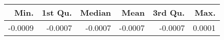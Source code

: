 \begin{table}[ht]
\centering
\begin{tabular}{rrrrrr}
  \hline
Min. & 1st Qu. & Median & Mean & 3rd Qu. & Max. \\ 
  \hline
-0.0009 & -0.0007 & -0.0007 & -0.0007 & -0.0007 & 0.0001 \\ 
   \hline
\end{tabular}
\end{table}
